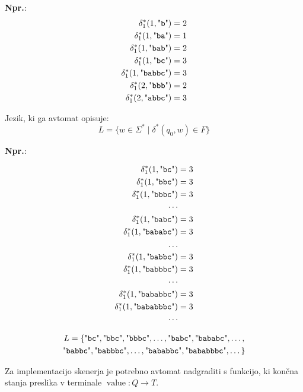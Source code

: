 \documentclass{article}
\DeclareMathOperator{\acc}{value}
\newcommand{\Ex}{\textbf{Npr.}:\ }
\newcommand{\Str}[1]{\text{\textquotedbl\texttt{#1}\textquotedbl}}
\newcommand{\Kleene}[1]{#1^\ast}
\begin{document}
\Ex
\begin{align*}
  \Kleene{\delta_1}(1, \Str{b}) &= 2 \\
  \Kleene{\delta_1}(1, \Str{ba}) &= 1 \\
  \Kleene{\delta_1}(1, \Str{bab}) &= 2 \\
  \Kleene{\delta_1}(1, \Str{bc}) &= 3 \\
  \Kleene{\delta_1}(1, \Str{babbc}) &= 3 \\
  \Kleene{\delta_1}(2, \Str{bbb}) &= 2 \\
  \Kleene{\delta_1}(2, \Str{abbc}) &= 3
\end{align*}

Jezik, ki ga avtomat opisuje:
\begin{equation*}
  L = \{w \in \Kleene{\Sigma} \mid \Kleene{\delta}(q_0, w) \in F\}
\end{equation*}

\Ex

\begin{align*}
  \Kleene{\delta_1}(1, \Str{bc}) &= 3 \\
  \Kleene{\delta_1}(1, \Str{bbc}) &= 3 \\
  \Kleene{\delta_1}(1, \Str{bbbc}) &= 3 \\
  \cdots \\
  \Kleene{\delta_1}(1, \Str{babc}) &= 3 \\
  \Kleene{\delta_1}(1, \Str{bababc}) &= 3 \\
  \ldots \\
  \Kleene{\delta_1}(1, \Str{babbc}) &= 3 \\
  \Kleene{\delta_1}(1, \Str{babbbc}) &= 3 \\
  \cdots \\
  \Kleene{\delta_1}(1, \Str{bababbc}) &= 3 \\
  \Kleene{\delta_1}(1, \Str{bababbbc}) &= 3 \\
  \cdots \\
\end{align*}

\begin{multline*}
  L = \{ \Str{bc}, \Str{bbc}, \Str{bbbc}, \ldots, \Str{babc}, \Str{bababc}, \ldots,\\
  \Str{babbc},  \Str{babbbc}, \ldots, \Str{bababbc}, \Str{bababbbc}, \dots \}
\end{multline*}

Za implementacijo skenerja je potrebno avtomat nadgraditi s funkcijo, ki končna stanja preslika v terminale $\acc: Q \rightarrow T$.
\end{document}

